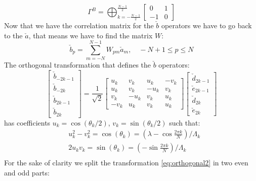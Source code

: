 \documentclass[10pt,a4paper]{article}
\begin{document}
\begin{equation}\label{eq:corrmatrb}\Gamma^{B}=\bigoplus_{k=-\frac{N-1}{2}}^{\frac{N-1}{2}}\left[\begin{array}{rr}
0 & 1 \\
-1 & 0
\end{array}\right]\end{equation}
Now that we have the correlation matrix for the $\check{b}$ operators we have to go back to the $\check{a}$, that means we have to find the matrix $W$:
\begin{equation}\label{eq:wmatrix}\check{b}_{p}=\sum_{m=-N}^{N-1} W_{p m} \check{a}_{m}, \quad-N+1 \leq p \leq N\end{equation}
The orthogonal transformation that defines the $\check{b}$ operators:
\begin{equation}\label{eq:orthogonal2}\left[\begin{array}{c}
\check{b}_{-2 k-1} \\
\check{b}_{-2 k} \\
\check{b}_{2 k-1} \\
\check{b}_{2 k}
\end{array}\right]=\frac{1}{\sqrt{2}}\left[\begin{array}{cccc}
u_{k} & v_{k} & u_{k} & -v_{k} \\
u_{k} & v_{k} & -u_{k} & v_{k} \\
v_{k} & -u_{k} & v_{k} & u_{k} \\
-v_{k} & u_{k} & v_{k} & u_{k}
\end{array}\right]\left[\begin{array}{c}
\check{d}_{2 k-1} \\
\check{e}_{2 k-1} \\
\check{d}_{2 k} \\
\check{e}_{2 k}
\end{array}\right]\end{equation}
has coefficients $u_k=\cos(\theta_k/2)$, $v_k=\sin(\theta_k/2)$ such that:
\begin{equation}\begin{aligned}
&u_k^2-v_k^2=\cos(\theta_k)=\left(\lambda-\cos \frac{2 \pi k }{N}\right)/\Lambda_k\\
&2u_kv_k=\sin(\theta_k)=\left(-\sin \frac{2 \pi k }{N}\right)/\Lambda_k\\
\end{aligned}
\end{equation} 
For the sake of clarity we split the transformation \ref{eq:orthogonal2} in two even and odd parts:
\end{document}
